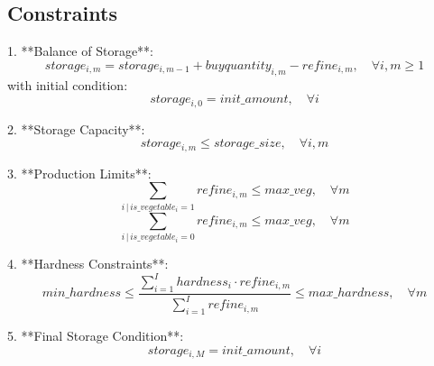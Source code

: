 \documentclass{article}
\begin{document}
\subsection*{Constraints}

1. **Balance of Storage**:
   \[
   storage_{i,m} = storage_{i,m-1} + buyquantity_{i,m} - refine_{i,m}, \quad \forall i, m \geq 1
   \]
   with initial condition:
   \[
   storage_{i,0} = init\_amount, \quad \forall i
   \]

2. **Storage Capacity**:
   \[
   storage_{i,m} \leq storage\_size, \quad \forall i, m
   \]

3. **Production Limits**:
   \[
   \sum_{i \,|\, is\_vegetable_i=1} refine_{i,m} \leq max\_veg, \quad \forall m
   \]
   \[
   \sum_{i \,|\, is\_vegetable_i=0} refine_{i,m} \leq max\_veg, \quad \forall m
   \]

4. **Hardness Constraints**:
   \[
   min\_hardness \leq \frac{\sum_{i=1}^{I} hardness_i \cdot refine_{i,m}}{\sum_{i=1}^{I} refine_{i,m}} \leq max\_hardness, \quad \forall m
   \]

5. **Final Storage Condition**:
   \[
   storage_{i,M} = init\_amount, \quad \forall i
   \]
\end{document}
